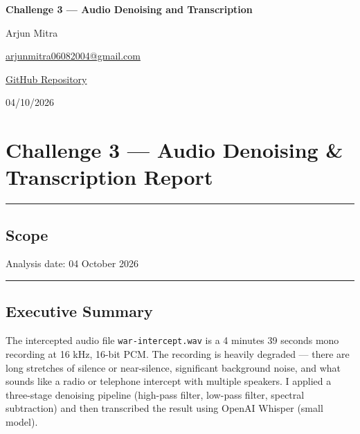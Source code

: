 \documentclass[
]{article}
\author{Arjun Mitra\\\href{mailto:arjunmitra06082004@gmail.com}{arjunmitra06082004@gmail.com}\\\href{https://github.com/TheLearnerAllTime002/Digital-Forensics-Challeng}{GitHub Repository}}
\date{04/10/2026}
\begin{document}
\begin{titlepage}
\centering
\vspace*{2cm}
{\LARGE\bfseries Challenge 3 --- Audio Denoising and Transcription\par}
\vspace{1.5cm}
{\large Arjun Mitra\par}
\vspace{0.3cm}
{\normalsize \href{mailto:arjunmitra06082004@gmail.com}{arjunmitra06082004@gmail.com}\par}
\vspace{0.3cm}
{\normalsize \href{https://github.com/TheLearnerAllTime002/Digital-Forensics-Challeng}{GitHub Repository}\par}
\vfill
{\large 04/10/2026\par}
\end{titlepage}
\tableofcontents
\newpage


\section{Challenge 3 --- Audio Denoising \& Transcription
Report}\label{challenge-3-audio-denoising-transcription-report}

\begin{center}\rule{0.5\linewidth}{0.5pt}\end{center}

\subsection{Scope}\label{scope}

Analysis date: 04 October 2026

\begin{center}\rule{0.5\linewidth}{0.5pt}\end{center}

\subsection{Executive Summary}\label{executive-summary}

The intercepted audio file \texttt{war-intercept.wav} is a 4 minutes 39
seconds mono recording at 16 kHz, 16-bit PCM. The recording is heavily
degraded --- there are long stretches of silence or near-silence,
significant background noise, and what sounds like a radio or telephone
intercept with multiple speakers. I applied a three-stage denoising
pipeline (high-pass filter, low-pass filter, spectral subtraction) and
then transcribed the result using OpenAI Whisper (small model).
\end{document}
